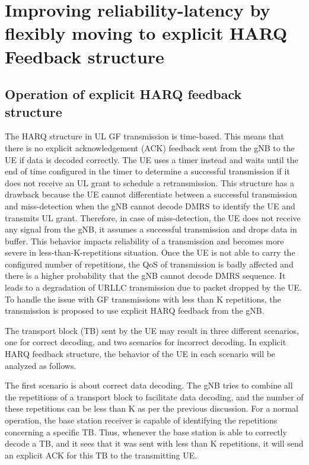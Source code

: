 \documentclass[conference]{IEEEtran}
\begin{document}
\section{Improving reliability-latency by flexibly moving to explicit HARQ Feedback structure}\label{II}

\subsection{Operation of explicit HARQ feedback structure}\label{IIAA}

The HARQ structure in UL GF transmission is time-based. This means that there is no explicit acknowledgement (ACK) feedback sent from the gNB to the UE if data is decoded correctly. The UE uses a timer instead and waits until the end of time configured in the timer to determine a successful transmission if it does not receive an UL grant to schedule a retransmission. This structure has a drawback because the UE cannot differentiate between a successful transmission and miss-detection when the gNB cannot decode DMRS to identify the UE and transmits UL grant. Therefore, in case of miss-detection, the UE does not receive any signal from the gNB, it assumes a successful transmission and drops data in buffer. This behavior impacts reliability of a transmission and becomes more severe in less-than-K-repetitions situation. Once the UE is not able to carry the configured number of repetitions, the QoS of transmission is badly affected and there is a higher probability that the gNB cannot decode DMRS sequence. It leads to a degradation of URLLC transmission due to packet dropped by the UE. To handle the issue with GF transmissions with less than K repetitions, the transmission is proposed to use explicit HARQ feedback from the gNB. 

The transport block (TB) sent by the UE may result in three different scenarios, one for correct decoding, and two scenarios for incorrect decoding. In explicit HARQ feedback structure, the behavior of the UE in each scenario will be analyzed as follows. 

The first scenario is about correct data decoding. The gNB tries to combine all the repetitions of a transport block to facilitate data decoding, and the number of these repetitions can be less than K as per the previous discussion. For a normal operation, the base station receiver is capable of identifying the repetitions concerning a specific TB. Thus, whenever the base station is able to correctly decode a TB, and it sees that it was sent with less than K repetitions, it will send an explicit ACK for this TB to the transmitting UE.
\end{document}
